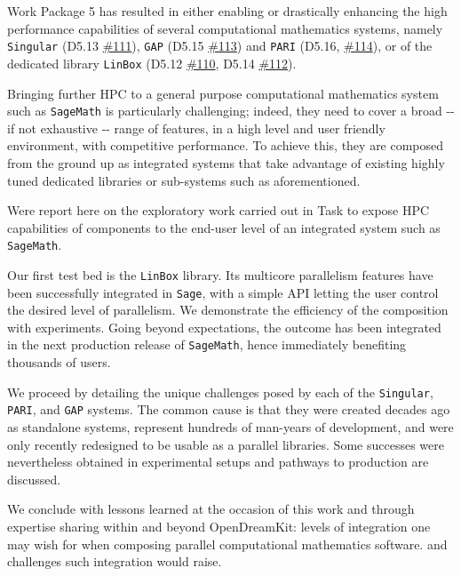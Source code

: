 Work Package 5 has resulted in either enabling or drastically enhancing
the high performance capabilities of several computational mathematics
systems, namely \texttt{Singular} (D5.13
\href{https://github.com/OpenDreamKit/OpenDreamKit/issues/111}{\#111}),
\texttt{GAP} (D5.15
\href{https://github.com/OpenDreamKit/OpenDreamKit/issues/113}{\#113})
and \texttt{PARI} (D5.16,
\href{https://github.com/OpenDreamKit/OpenDreamKit/issues/114}{\#114}),
or of the dedicated library \texttt{LinBox} (D5.12
\href{https://github.com/OpenDreamKit/OpenDreamKit/issues/110}{\#110},
D5.14
\href{https://github.com/OpenDreamKit/OpenDreamKit/issues/112}{\#112}).

Bringing further HPC to a general purpose computational mathematics
system such as \texttt{SageMath} is particularly challenging; indeed,
they need to cover a broad -\/- if not exhaustive -\/- range of
features, in a high level and user friendly environment, with
competitive performance. To achieve this, they are composed from the
ground up as integrated systems that take advantage of existing highly
tuned dedicated libraries or sub-systems such as aforementioned.

Were report here on the exploratory work carried out in Task to expose
HPC capabilities of components to the end-user level of an integrated
system such as \texttt{SageMath}.

Our first test bed is the \texttt{LinBox} library. Its multicore
parallelism features have been successfully integrated in \texttt{Sage},
with a simple API letting the user control the desired level of
parallelism. We demonstrate the efficiency of the composition with
experiments. Going beyond expectations, the outcome has been integrated
in the next production release of \texttt{SageMath}, hence immediately
benefiting thousands of users.

We proceed by detailing the unique challenges posed by each of the
\texttt{Singular}, \texttt{PARI}, and \texttt{GAP} systems. The common
cause is that they were created decades ago as standalone systems,
represent hundreds of man-years of development, and were only recently
redesigned to be usable as a parallel libraries. Some successes were
nevertheless obtained in experimental setups and pathways to production
are discussed.

We conclude with lessons learned at the occasion of this work and
through expertise sharing within and beyond OpenDreamKit: levels of
integration one may wish for when composing parallel computational
mathematics software. and challenges such integration would raise.
